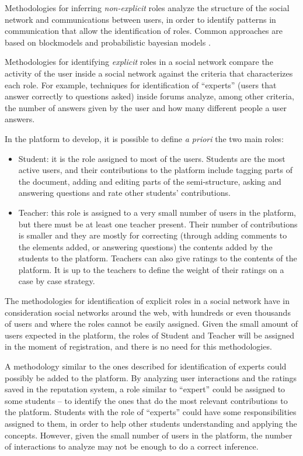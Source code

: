 Methodologies for inferring \textit{non-explicit} roles analyze the structure of the social network and communications between users, in order to identify patterns in communication that allow the identification of roles. Common approaches are based on blockmodels \cite{borgatti1993two,breiger1975algorithm} and probabilistic bayesian models \cite{steyvers2004probabilistic,mccallum2007topic,daud2009generalized}.

Methodologies for identifying \textit{explicit} roles in a social network compare the activity of the user inside a social network against the criteria that characterizes each role. For example, techniques for identification of ``experts'' (users that answer correctly to questions asked) inside forums \cite{zhang2007expertise} analyze, among other criteria, the number of answers given by the user and how many different people a user answers.

In the platform to develop, it is possible to define \textit{a priori} the two main roles:
\begin{itemize}
\item Student: it is the role assigned to most of the users. Students are the most active users, and their contributions to the platform include tagging parts of the document, adding and editing parts of the semi-structure, asking and answering questions and rate other students' contributions.

\item Teacher: this role is assigned to a very small number of users in the platform, but there must be at least one teacher present. Their number of contributions is smaller and they are mostly for correcting (through adding comments to the elements added, or answering questions) the contents added by the students to the platform. Teachers can also give ratings to the contents of the platform. It is up to the teachers to define the weight of their ratings on a case by case strategy.
\end{itemize}

The methodologies for identification of explicit roles in a social network \cite{zhang2007expertise,agarwal2008identifying} have in consideration social networks around the web, with hundreds or even thousands of users and where the roles cannot be easily assigned. Given the small amount of users expected in the platform, the roles of Student and Teacher will be assigned in the moment of registration, and there is no need for this methodologies. 

A methodology similar to the ones described for identification of experts \cite{zhang2007expertise} could possibly be added to the platform. By analyzing user interactions and the ratings saved in the reputation system, a role similar to ``expert'' could be assigned to some students – to identify the ones that do the most relevant contributions to the platform. Students with the role of ``experts'' could have some responsibilities assigned to them, in order to help other students understanding and applying the concepts. However, given the small number of users in the platform, the number of interactions to analyze may not be enough to do a correct inference.

